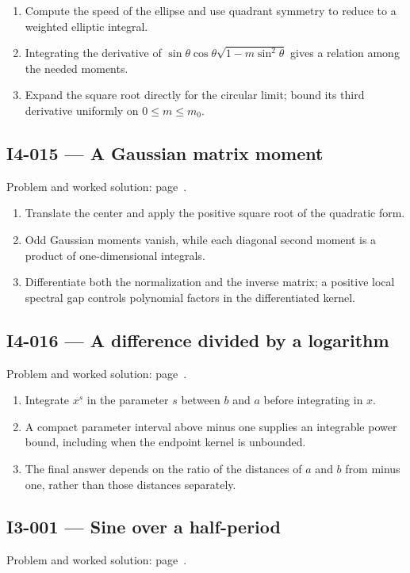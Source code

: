 \documentclass[11pt,oneside,openany]{book}
\begin{document}
\begin{enumerate}
\item Compute the speed of the ellipse and use quadrant symmetry to reduce to a weighted elliptic integral.
\item Integrating the derivative of \(\sin\theta\cos\theta\sqrt{1-m\sin^2\theta}\) gives a relation among the needed moments.
\item Expand the square root directly for the circular limit; bound its third derivative uniformly on \(0\le m\le m_0\).
\end{enumerate}
\subsection*{I4-015 --- A Gaussian matrix moment}
\label{hints:I4-015}
Problem and worked solution: page~\pageref{problem:I4-015}.

\begin{enumerate}
\item Translate the center and apply the positive square root of the quadratic form.
\item Odd Gaussian moments vanish, while each diagonal second moment is a product of one-dimensional integrals.
\item Differentiate both the normalization and the inverse matrix; a positive local spectral gap controls polynomial factors in the differentiated kernel.
\end{enumerate}
\subsection*{I4-016 --- A difference divided by a logarithm}
\label{hints:I4-016}
Problem and worked solution: page~\pageref{problem:I4-016}.

\begin{enumerate}
\item Integrate \(x^s\) in the parameter \(s\) between \(b\) and \(a\) before integrating in \(x\).
\item A compact parameter interval above minus one supplies an integrable power bound, including when the endpoint kernel is unbounded.
\item The final answer depends on the ratio of the distances of \(a\) and \(b\) from minus one, rather than those distances separately.
\end{enumerate}
\subsection*{I3-001 --- Sine over a half-period}
\label{hints:I3-001}
Problem and worked solution: page~\pageref{problem:I3-001}.
\end{document}
